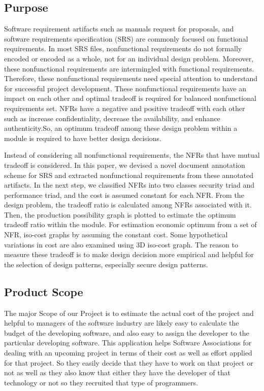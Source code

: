  \subsection{Purpose}
 Software requirement artifacts such as manuals request for proposals, and software requirements specification (SRS) are
 commonly focused on functional requirements. In most SRS files, nonfunctional requirements do not formally encoded or 
 encoded as a whole, not for an individual design problem. Moreover, these nonfunctional requirements are intermingled 
 with functional requirements. Therefore, these nonfunctional requirements need special attention to understand for
 successful project development. These nonfunctional requirements have an impact on each other and optimal tradeoff is
 required for balanced nonfunctional requirements set. NFRs have a negative and positive tradeoff with each other such
 as increase confidentiality, decrease the availability, and enhance authenticity.So, an optimum tradeoff among these 
 design problem within a module is required to have better design decisions. 
 
 \hspace{10mm}Instead of considering all nonfunctional
 requirements, the NFRs that have mutual tradeoff is considered. In this paper, we devised a novel document annotation
 scheme for SRS and extracted nonfunctional requirements from these annotated artifacts. In the next step, we classified
 NFRs into two classes security triad and performance triad, and the cost is assumed constant for each NFR. From the design
 problem, the tradeoff ratio is calculated among NFRs associated with it. Then, the production possibility graph is plotted
 to estimate the optimum tradeoff ratio within the module. For estimation economic optimum from a set of NFR, iso-cost graphs
 by assuming the constant cost. Some hypothetical variations in cost are also examined using 3D iso-cost graph. The reason to
 measure these tradeoff is to make design decision more empirical and helpful for the selection of design patterns, especially
 secure design patterns.

    \subsection{Product Scope}
    The major Scope of our Project is to estimate the actual cost of the project and helpful to managers of the software industry
    are likely easy to calculate the budget of the developing software, and also easy to assign the developer to the particular 
    developing software. This application helps Software Associations for dealing with an upcoming project in terms of their cost 
    as well as effort applied for that project. So they easily decide that they have to work on that project or not as well as they also
    know that either they have the developer of that technology or not so they recruited that type of programmers.
    \\
    
